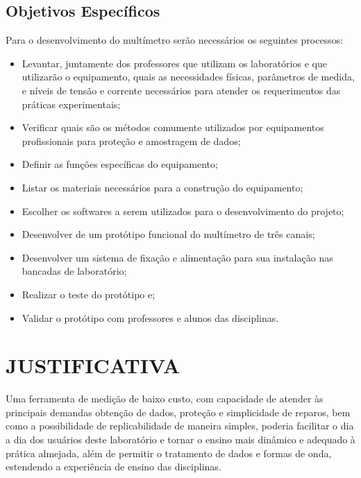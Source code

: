 \subsection{Objetivos Específicos}\label{sec:objespec}
Para o desenvolvimento do multímetro serão necessários os seguintes processos:

\begin{itemize}
    \item Levantar, juntamente dos professores que utilizam os laboratórios e que utilizarão o equipamento, quais as necessidades físicas, parâmetros de medida, e níveis de tensão e corrente necessários para atender os requerimentos das práticas experimentais;
    \item Verificar quais são os métodos comumente utilizados por equipamentos profissionais para proteção e amostragem de dados;
    \item Definir as funções específicas do equipamento;
    \item Listar os materiais necessários para a construção do equipamento;
    \item Escolher os softwares a serem utilizados para o desenvolvimento do projeto;
    \item Desenvolver de um protótipo funcional do multímetro de três canais;
    \item Desenvolver um sistema de fixação e alimentação para sua instalação nas bancadas de laboratório;
    \item Realizar o teste do protótipo e;
    \item Validar o protótipo com professores e alunos das disciplinas.
\end{itemize}

\section{JUSTIFICATIVA}\label{sec:justificativa}
Uma ferramenta de medição de baixo custo, com capacidade de atender às principais demandas obtenção de dados, proteção e simplicidade de reparos, bem como a possibilidade de replicabilidade de maneira simples, poderia facilitar o dia a dia dos usuários deste laboratório e tornar o ensino mais dinâmico e adequado à prática almejada, além de permitir o tratamento de dados e formas de onda, estendendo a experiência de ensino das disciplinas.

